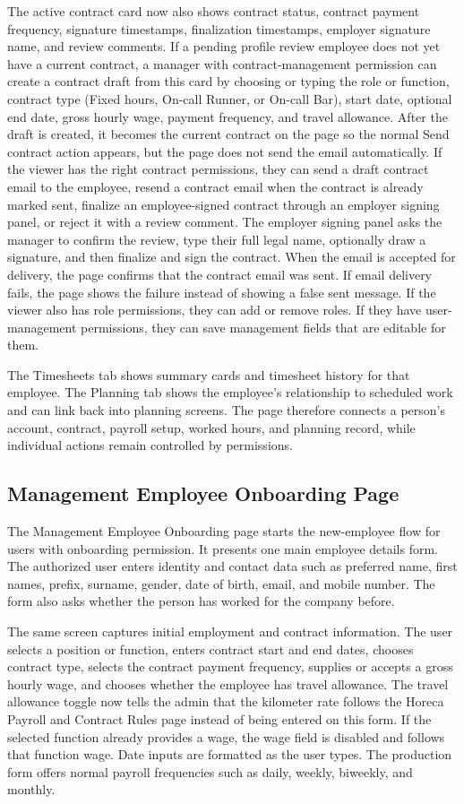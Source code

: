 \documentclass[11pt]{article}
\begin{document}
The active contract card now also shows contract status, contract payment frequency, signature timestamps, finalization timestamps, employer signature name, and review comments. If a pending profile review employee does not yet have a current contract, a manager with contract-management permission can create a contract draft from this card by choosing or typing the role or function, contract type (Fixed hours, On-call Runner, or On-call Bar), start date, optional end date, gross hourly wage, payment frequency, and travel allowance. After the draft is created, it becomes the current contract on the page so the normal Send contract action appears, but the page does not send the email automatically. If the viewer has the right contract permissions, they can send a draft contract email to the employee, resend a contract email when the contract is already marked sent, finalize an employee-signed contract through an employer signing panel, or reject it with a review comment. The employer signing panel asks the manager to confirm the review, type their full legal name, optionally draw a signature, and then finalize and sign the contract. When the email is accepted for delivery, the page confirms that the contract email was sent. If email delivery fails, the page shows the failure instead of showing a false sent message. If the viewer also has role permissions, they can add or remove roles. If they have user-management permissions, they can save management fields that are editable for them.

The Timesheets tab shows summary cards and timesheet history for that employee. The Planning tab shows the employee's relationship to scheduled work and can link back into planning screens. The page therefore connects a person's account, contract, payroll setup, worked hours, and planning record, while individual actions remain controlled by permissions.
\subsection{Management Employee Onboarding Page}

The Management Employee Onboarding page starts the new-employee flow for users with onboarding permission. It presents one main employee details form. The authorized user enters identity and contact data such as preferred name, first names, prefix, surname, gender, date of birth, email, and mobile number. The form also asks whether the person has worked for the company before.

The same screen captures initial employment and contract information. The user selects a position or function, enters contract start and end dates, chooses contract type, selects the contract payment frequency, supplies or accepts a gross hourly wage, and chooses whether the employee has travel allowance. The travel allowance toggle now tells the admin that the kilometer rate follows the Horeca Payroll and Contract Rules page instead of being entered on this form. If the selected function already provides a wage, the wage field is disabled and follows that function wage. Date inputs are formatted as the user types. The production form offers normal payroll frequencies such as daily, weekly, biweekly, and monthly.
\end{document}
